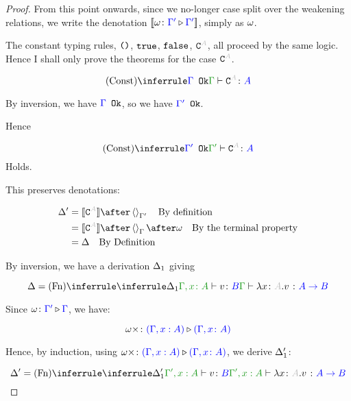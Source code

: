 \documentclass{report}
\begin{document}
\begin{framed}
\begin{proof}
        From this point onwards, since we no-longer case split over the weakening relations, we write the denotation ${\bf [\![}\omega \colon {\color{blue}\Gamma'} \triangleright {\color {blue} \Gamma'}{\bf ]\!]}$, simply as $\omega$.
        
        
        The constant typing rules, $\texttt{()}$, $\texttt{true}$, $\texttt{false}$, $\const{A}$, all proceed by the same logic. Hence I shall only prove the theorems for the case $\const{A}$.
        
        \begin{equation}
            \truleconst
        \end{equation}
        
        By inversion, we have ${\color{blue} \Gamma} \texttt{ Ok}$, so we have ${\color{blue} \Gamma'} \texttt{ Ok}$.
        
        Hence
        
        \begin{equation}
            \ntreeruleI{Const}{\ok{\G'}}{\typerelation{\G'}{\const{A}}{A}}
        \end{equation}
        Holds.
        
        This preserves denotations:
        
        
        \begin{align*}
            \D' & = \deno{\const{A}} \after \term{\G'}\qt{By definition}\\
            & = \deno{\const{A}} \after \term{\G}\after \w \qt{By the terminal property}\\
            & = \D\qt{By Definition}\\
        \end{align*}
        
        
        By inversion, we have a derivation $\Delta_1$ giving
        
        \begin{equation}
            \D = \ntreeruleI{Fn}{
                \treeruleI{\D_1}{\typerelation{\gax}{v}{B}}
            }{\gtyperelation{\lam{x}{A}{v}}{\ab}}
        \end{equation}
        
        Since $\omega \colon {\color{blue}\Gamma'} \triangleright {\color {blue} \Gamma}$, we have:
        
        \begin{equation}
            \omega\times \colon {\color{blue}(\Gamma,x:  A)} \triangleright {\color {blue} (\Gamma, x\colon A)}
        \end{equation}
        
        Hence, by induction, using $\omega\times \colon {\color{blue}(\Gamma,x:  A)} \triangleright {\color {blue} (\Gamma, x\colon A)}$, we derive $\Delta_1'$:
        
        \begin{equation}
            \D' = \ntreeruleI{Fn}{
                \treeruleI{\D_1'}{\typerelation{\G',x: A}{v}{B}}
            }{\typerelation{\G',x: A}{\lam{x}{A}{v}}{\ab}}
        \end{equation}
        

\end{proof}
\end{framed}
\end{document}

